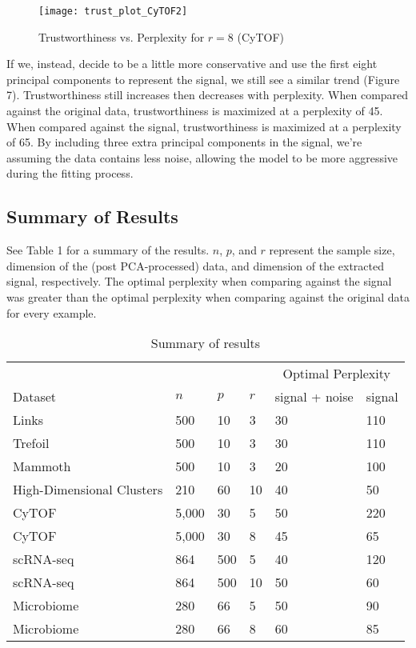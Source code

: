 \documentclass{article}
\begin{document}
\renewcommand{\thefigure}{7}
\begin{figure*}[t]
\texttt{[image: trust\_plot\_CyTOF2]}
\centering
\caption{Trustworthiness vs. Perplexity for $r = 8$ (CyTOF)}
\end{figure*}

If we, instead, decide to be a little more conservative and use the first eight principal components to represent the signal, we still see a similar trend (Figure 7). Trustworthiness still increases then decreases with perplexity. When compared against the original data, trustworthiness is maximized at a perplexity of 45. When compared against the signal, trustworthiness is maximized at a perplexity of 65. By including three extra principal components in the signal, we're assuming the data contains less noise, allowing the model to be more aggressive during the fitting process.

\subsection{Summary of Results}
See Table 1 for a summary of the results. $n$, $p$, and $r$ represent the sample size, dimension of the (post PCA-processed) data, and dimension of the extracted signal, respectively. The optimal perplexity when comparing against the signal was greater than the optimal perplexity when comparing against the original data for every example.

\begin{table*}[!b]
\centering
\begin{tabular}{@{}llllll@{}}
\toprule 
 & & & & \multicolumn{2}{c}{Optimal Perplexity} \\
\cmidrule{5-6}
Dataset & $n$ & $p$ & $r$ & signal + noise & signal \\
\midrule 
Links \cite{Distill} & 500 & 10 & 3 & 30 & 110 \\
Trefoil \cite{Distill} & 500 & 10 & 3 & 30 & 110 \\
Mammoth \cite{understanding DR} & 500 & 10 & 3 & 20 & 100 \\
High-Dimensional Clusters & 210 & 60 & 10 & 40 & 50 \\
CyTOF \cite{CyTOF data} & 5,000 & 30 & 5 & 50 & 220 \\
CyTOF \cite{CyTOF data} & 5,000 & 30 & 8 & 45 & 65 \\
scRNA-seq \cite{scRNA data} & 864 & 500 & 5 & 40 & 120 \\
scRNA-seq \cite{scRNA data} & 864 & 500 & 10 & 50 & 60 \\
Microbiome \cite{enterotype data} & 280 & 66 & 5 & 50 & 90 \\
Microbiome \cite{enterotype data} & 280 & 66 & 8 & 60 & 85 \\

\bottomrule
\end{tabular}
\caption{Summary of results}
\end{table*}
\end{document}
